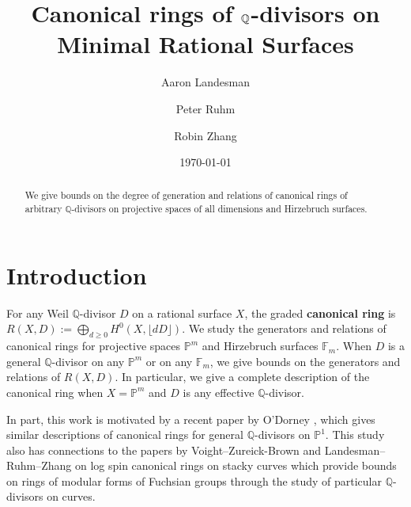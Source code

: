 \documentclass{amsart}
\title{Canonical rings of $\bq$-divisors on Minimal Rational Surfaces}
\author{Aaron Landesman}
\author{Peter Ruhm}
\author{Robin Zhang}
\date{\today}
\theoremstyle{plain}
\theoremstyle{definition}
\theoremstyle{remark}
\numberwithin{equation}{section}
\newcommand\bq{{\mathbb Q}}
\newcommand\bp{{\mathbb P}}
\newcommand\hirz{\mathbb{F}}
\begin{document}
\begin{abstract}
 	We give bounds on the degree of generation and relations of
	canonical rings of arbitrary $\bq$-divisors
	on projective spaces of all dimensions
	and Hirzebruch surfaces.
\end{abstract}

\maketitle
{}


\section{Introduction}
\label{sec:intro}
For any Weil $\bq$-divisor $D$ on a rational surface $X$, the graded
\textbf{canonical ring} is $R(X, D) := \bigoplus_{d \geq 0} H^0(X, \lfloor dD \rfloor)$.
We study the generators and relations of canonical
rings for projective spaces $\bp^m$ and Hirzebruch surfaces $\hirz_m$.
When $D$ is a general $\bq$-divisor on any $\bp^m$ or on any
$\hirz_m$, we give bounds on the generators and relations of
$R(X, D)$. In particular, we give a complete description of the
canonical ring when $X = \bp^m$ and $D$ is any effective
$\bq$-divisor.

In part, this work is motivated by a recent paper by
O'Dorney \cite{dorney:canonical}, which gives similar descriptions
of canonical rings for general $\bq$-divisors on $\bp^1$. This
study also has connections to the papers by Voight--Zureick-Brown 
\cite{vzb:stacky} and Landesman--Ruhm--Zhang \cite{lrz:spin-cring}
on log spin canonical rings on stacky curves which provide bounds
on rings of modular forms of Fuchsian groups through the study
of particular $\bq$-divisors on curves.
\end{document}
